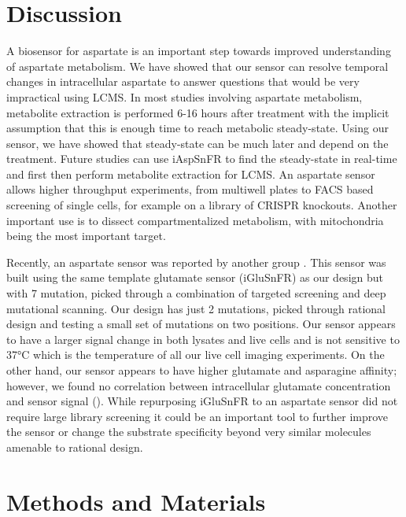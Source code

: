 \documentclass[9pt,lineno]{elife}
\begin{document}
\section{Discussion}
A biosensor for aspartate is an important step towards improved understanding of aspartate metabolism.
We have showed that our sensor can resolve temporal changes in intracellular aspartate to answer questions that would be very impractical using LCMS.
In most studies involving aspartate metabolism, metabolite extraction is performed 6-16 hours after treatment with the implicit assumption that this is enough time to reach metabolic steady-state.
Using our sensor, we have showed that steady-state can be much later and depend on the treatment.
Future studies can use iAspSnFR to find the steady-state in real-time and first then perform metabolite extraction for LCMS.
An aspartate sensor allows higher throughput experiments, from multiwell plates to FACS based screening of single cells, for example on a library of CRISPR knockouts.
Another important use is to dissect compartmentalized metabolism, with mitochondria being the most important target.

Recently, an aspartate sensor was reported by another group \citep{Hellweg2023}.
This sensor was built using the same template glutamate sensor (iGluSnFR) as our design but with 7 mutation, picked through a combination of targeted screening and deep mutational scanning.
Our design has just 2 mutations, picked through rational design and testing a small set of mutations on two positions.
Our sensor appears to have a larger signal change in both lysates and live cells and is not sensitive to 37°C which is the temperature of all our live cell imaging experiments.
On the other hand, our sensor appears to have higher glutamate and asparagine affinity; however, we found no correlation between intracellular glutamate concentration and sensor signal ().
While repurposing iGluSnFR to an aspartate sensor did not require large library screening it could be an important tool to further improve the sensor or change the substrate specificity beyond very similar molecules amenable to rational design.







\section{Methods and Materials}
\end{document}
